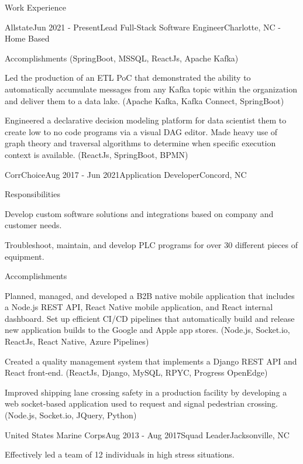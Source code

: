 \begin{basicSection}{Work Experience}
\begin{workExperienceSection}{Allstate}{Jun 2021 - Present}{Lead Full-Stack Software Engineer}{Charlotte, NC - Home Based}
\begin{workExperienceSectionSubSection}{Accomplishments}
            (SpringBoot, MSSQL, ReactJs, Apache Kafka)
            \item Led the production of an ETL PoC that demonstrated the ability to automatically accumulate messages from any Kafka topic within the organization and deliver them to a data lake.
            (Apache Kafka, Kafka Connect, SpringBoot)
            \item Engineered a declarative decision modeling platform for data scientist them to create low to no code programs via a visual DAG editor.
            Made heavy use of graph theory and traversal algorithms to determine when specific execution context is available.
            (ReactJs, SpringBoot, BPMN)
        \end{workExperienceSectionSubSection}
    \end{workExperienceSection}
    \begin{workExperienceSection}{CorrChoice}{Aug 2017 - Jun 2021}{Application Developer}{Concord, NC}
        \begin{workExperienceSectionSubSection}{Responsibilities}
            \item Develop custom software solutions and integrations based on company and customer needs.
            \item Troubleshoot, maintain, and develop PLC programs for over 30 different pieces of equipment.
        \end{workExperienceSectionSubSection}
        \begin{workExperienceSectionSubSection}{Accomplishments}
            \item Planned, managed, and developed a B2B native mobile application that includes a Node.js REST API, React Native mobile application, and React internal dashboard.
            Set up efficient CI/CD pipelines that automatically build and release new application builds to the Google and Apple app stores.
            (Node.js, Socket.io, ReactJs, React Native, Azure Pipelines)
            \item Created a quality management system that implements a Django REST API and React front-end.
            (ReactJs, Django, MySQL, RPYC, Progress OpenEdge)
            \item Improved shipping lane crossing safety in a production facility by developing a web socket-based application used to request and signal pedestrian crossing.
            (Node.js, Socket.io, JQuery, Python)
        \end{workExperienceSectionSubSection}
    \end{workExperienceSection}
    \begin{workExperienceSection}{United States Marine Corps}{Aug 2013 - Aug 2017}{Squad Leader}{Jacksonville, NC}
        \item Effectively led a team of 12 individuals in high stress situations.
    \end{workExperienceSection}
\end{basicSection}